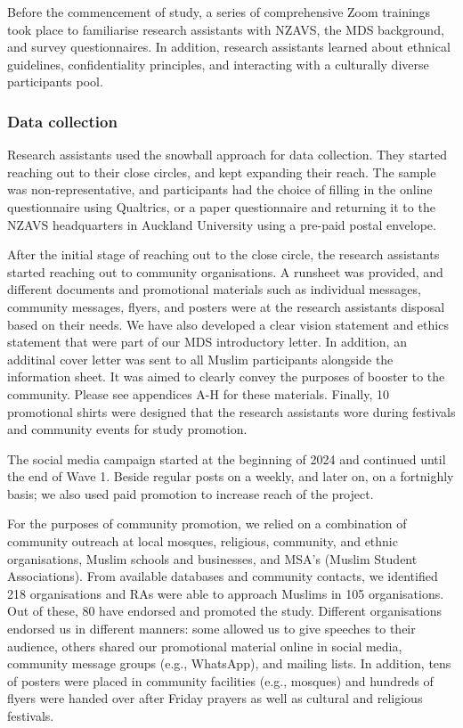 \documentclass[
]{interact}
\begin{document}
Before the commencement of study, a series of comprehensive Zoom
trainings took place to familiarise research assistants with NZAVS, the
MDS background, and survey questionnaires. In addition, research
assistants learned about ethnical guidelines, confidentiality
principles, and interacting with a culturally diverse participants pool.

\subsubsection{Data collection}\label{data-collection}

Research assistants used the snowball approach for data collection. They
started reaching out to their close circles, and kept expanding their
reach. The sample was non-representative, and participants had the
choice of filling in the online questionnaire using Qualtrics, or a
paper questionnaire and returning it to the NZAVS headquarters in
Auckland University using a pre-paid postal envelope.

After the initial stage of reaching out to the close circle, the
research assistants started reaching out to community organisations. A
runsheet was provided, and different documents and promotional materials
such as individual messages, community messages, flyers, and posters
were at the research assistants disposal based on their needs. We have
also developed a clear vision statement and ethics statement that were
part of our MDS introductory letter. In addition, an additinal cover
letter was sent to all Muslim participants alongside the information
sheet. It was aimed to clearly convey the purposes of booster to the
community. Please see appendices A-H for these materials. Finally, 10
promotional shirts were designed that the research assistants wore
during festivals and community events for study promotion.

The social media campaign started at the beginning of 2024 and continued
until the end of Wave 1. Beside regular posts on a weekly, and later on,
on a fortnighly basis; we also used paid promotion to increase reach of
the project.

For the purposes of community promotion, we relied on a combination of
community outreach at local mosques, religious, community, and ethnic
organisations, Muslim schools and businesses, and MSA's (Muslim Student
Associations). From available databases and community contacts, we
identified 218 organisations and RAs were able to approach Muslims in
105 organisations. Out of these, 80 have endorsed and promoted the
study. Different organisations endorsed us in different manners: some
allowed us to give speeches to their audience, others shared our
promotional material online in social media, community message groups
(e.g., WhatsApp), and mailing lists. In addition, tens of posters were
placed in community facilities (e.g., mosques) and hundreds of flyers
were handed over after Friday prayers as well as cultural and religious
festivals.
\end{document}
